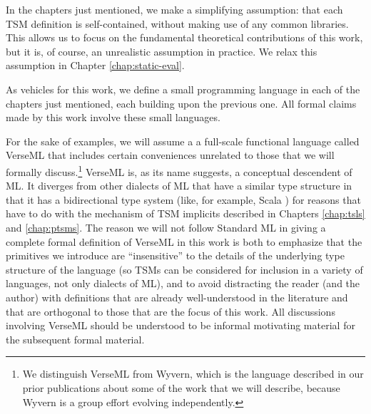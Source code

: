 In the chapters just mentioned, we make a simplifying assumption: that each TSM definition is self-contained, without making use of any common libraries. This allows us to focus on the fundamental theoretical contributions of this work, but it is, of course, an unrealistic assumption in practice. We relax this assumption in Chapter \ref{chap:static-eval}.

As vehicles for this work, we define a small programming language in each of the chapters just mentioned, each building upon the previous one. All formal claims made by this work involve these small languages.

For the sake of examples, we will assume a  a full-scale functional language called VerseML that includes certain conveniences unrelated to those that we will formally discuss.\footnote{We distinguish VerseML from Wyvern, which is the language described in our prior publications about some of the work that we will describe, because Wyvern is a group effort evolving independently.} VerseML is, as its name suggests, a conceptual descendent of ML. It diverges from other dialects of ML that have a similar type structure in that it has a bidirectional type system \cite{Pierce:2000:LTI:345099.345100} (like, for example, Scala \cite{OdeZenZen01}) for reasons that have to do with the mechanism of TSM implicits described in Chapters \ref{chap:tsls} and \ref{chap:ptsms}. The reason we will not follow Standard ML \cite{mthm97-for-dart} in giving a complete formal definition of VerseML in this work is both to emphasize that the primitives we introduce are ``insensitive'' to the details of the underlying type structure of the language (so TSMs can be considered for inclusion in a variety of languages, not only dialects of ML), and to avoid distracting the reader (and the author) with definitions that are already well-understood in the literature and that are orthogonal to those that are the focus of this work. All discussions involving VerseML should be understood to be informal motivating material for the subsequent formal material. %

